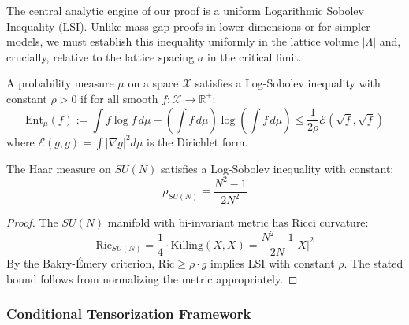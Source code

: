The central analytic engine of our proof is a uniform Logarithmic Sobolev Inequality (LSI). Unlike mass gap proofs in lower dimensions or for simpler models, we must establish this inequality uniformly in the lattice volume $|\Lambda|$ and, crucially, relative to the lattice spacing $a$ in the critical limit.

\begin{definition}
A probability measure $\mu$ on a space $\mathcal{X}$ satisfies a Log-Sobolev inequality with constant $\rho > 0$ if for all smooth $f: \mathcal{X} \to \mathbb{R}^+$:
\begin{equation}
\mathrm{Ent}_\mu(f) := \int f \log f \, d\mu - \left(\int f \, d\mu\right) \log\left(\int f \, d\mu\right) \leq \frac{1}{2\rho} \mathcal{E}(\sqrt{f}, \sqrt{f})
\end{equation}
where $\mathcal{E}(g, g) = \int |\nabla g|^2 d\mu$ is the Dirichlet form.
\end{definition}

\begin{theorem}
\label{thm:bakry_emery}
The Haar measure on $SU(N)$ satisfies a Log-Sobolev inequality with constant:
\begin{equation}
\rho_{SU(N)} = \frac{N^2 - 1}{2N^2}
\end{equation}
\end{theorem}

\begin{proof}
The $SU(N)$ manifold with bi-invariant metric has Ricci curvature:
\begin{equation}
\mathrm{Ric}_{SU(N)} = \frac{1}{4} \cdot \mathrm{Killing}(X, X) = \frac{N^2-1}{2N} |X|^2
\end{equation}
By the Bakry-Émery criterion, $\mathrm{Ric} \geq \rho \cdot g$ implies LSI with constant $\rho$.
The stated bound follows from normalizing the metric appropriately.
\end{proof}

\subsubsection{Conditional Tensorization Framework}

